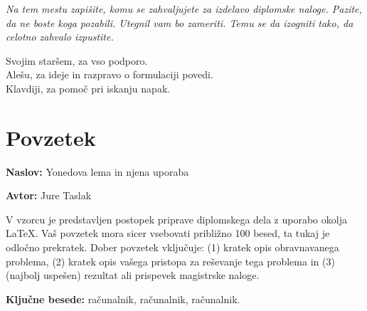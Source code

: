 \documentclass[12pt,a4paper]{book}
\newcommand{\ttitle}{Yonedova lema in njena uporaba}
\newcommand{\tauthor}{Jure Taslak}
\newcommand{\tkeywords}{računalnik, računalnik, računalnik}
\newcommand{\clearemptydoublepage}{\newpage{\pagestyle{empty}\cleardoublepage}}
\theoremstyle{definition}
\theoremstyle{plain}
\theoremstyle{definition}
\theoremstyle{remark}
\begin{document}
\vspace{2cm}

\clearemptydoublepage

\thispagestyle{empty}\mbox{}\vfill\null\it%
\noindent
Na tem mestu zapišite, komu se zahvaljujete za izdelavo diplomske naloge. Pazite, da ne boste koga pozabili. Utegnil vam bo zameriti. Temu se da izogniti tako, da celotno zahvalo izpustite.
\rm\normalfont

\clearemptydoublepage

Svojim staršem, za vso podporo. \\
Alešu, za ideje in razpravo o formulaciji povedi. \\
Klavdiji, za pomoč pri iskanju napak.

\thispagestyle{empty}\mbox{}{\textheight}\mbox{}\hfill\begin{minipage}{0.55\textwidth}%

\normalfont\end{minipage}

\clearemptydoublepage


\pagestyle{empty}
\def\thepage{}%
\tableofcontents{}

\clearemptydoublepage


\chapter*{Povzetek}

\noindent\textbf{Naslov:} \ttitle
\bigskip

\noindent\textbf{Avtor:} \tauthor
\bigskip

\noindent V vzorcu je predstavljen postopek priprave diplomskega dela z uporabo okolja \LaTeX. Vaš povzetek mora sicer vsebovati približno 100 besed, ta tukaj je odločno prekratek.
Dober povzetek vključuje: (1) kratek opis obravnavanega problema, (2) kratek opis vašega pristopa za reševanje tega problema in (3) (najbolj uspešen) rezultat ali prispevek magistrske naloge.

\bigskip

\noindent\textbf{Ključne besede:} \tkeywords.
\clearemptydoublepage
\end{document}
